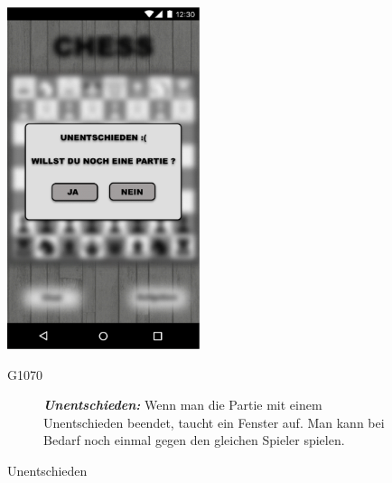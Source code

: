 \documentclass[parskip=full]{scrartcl}
\begin{document}
\begin{figure}[htp]
	\begin{minipage}[t]{6cm}
		\vspace{0pt}
		\includegraphics[height=100mm]{unentschieden.png}
		\caption{Unentschieden}
		\label{fig:Unentschieden}
	\end{minipage}
	\hfill
	\begin{minipage}[t]{6cm}
		\vspace{0pt}
		\begin{description}
			\item[G1070] \textbf{\textit{Unentschieden: }} Wenn man die Partie mit einem Unentschieden beendet, taucht ein Fenster auf. Man kann bei Bedarf noch einmal gegen den gleichen Spieler spielen.
		\end{description}
	\end{minipage}


\end{figure}
\end{document}
